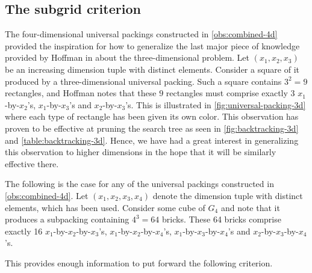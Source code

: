 \subsection{The subgrid criterion}
The four-dimensional universal packings constructed in \cref{obs:combined-4d} provided the inspiration for how to generalize the last major piece of knowledge provided by Hoffman in \cite[p. 221]{Hoffman1981} about the three-dimensional problem. Let $(x_1, x_2, x_3)$ be an increasing dimension tuple with distinct elements. Consider a square of it produced by a three-dimensional universal packing. Such a square contains $3^2 = 9$ rectangles, and Hoffman notes that these $9$ rectangles must comprise exactly 3 $x_1$-by-$x_2$'s, $x_1$-by-$x_3$'s and $x_2$-by-$x_3$'s. This is illustrated in \cref{fig:universal-packing-3d} where each type of rectangle has been given its own color. This observation has proven to be effective at pruning the search tree as seen in \cref{fig:backtracking-3d} and \cref{table:backtracking-3d}. Hence, we have had a great interest in generalizing this observation to higher dimensions in the hope that it will be similarly effective there.

\begin{observation}
The following is the case for any of the universal packings constructed in \cref{obs:combined-4d}. Let $(x_1, x_2, x_3, x_4)$ denote the dimension tuple with distinct elements, which has been used. Consider some cube of $G_4$ and note that it produces a subpacking containing $4^3 = 64$ bricks. These 64 bricks comprise exactly 16 $x_1$-by-$x_2$-by-$x_3$'s, $x_1$-by-$x_2$-by-$x_4$'s, $x_1$-by-$x_3$-by-$x_4$'s and $x_2$-by-$x_3$-by-$x_4$'s.
\end{observation}

\noindent This provides enough information to put forward the following criterion.


